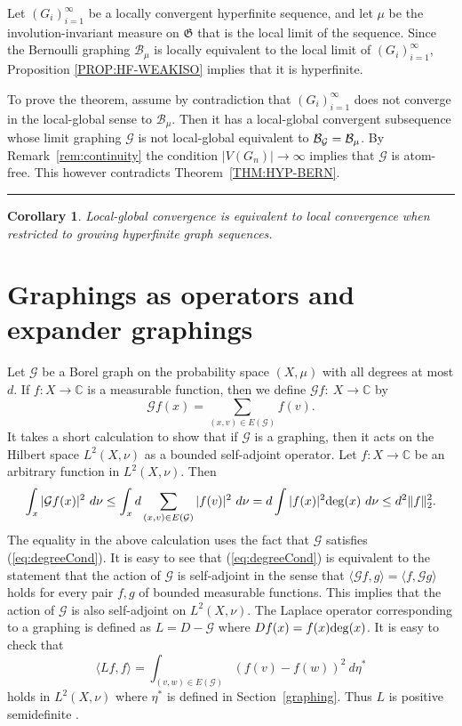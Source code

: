\documentclass{article}
\newtheorem{corollary}[theorem]{Corollary}
\newenvironment{proof}{{\bf Proof.}}{\hfill\rule{2mm}{2mm}\medskip}
\def\GG{\mathcal{G}}\def\HH{\mathcal{H}}\def\II{\mathcal{I}}
\def\Gf{\mathfrak{G}}\def\Hf{\mathfrak{H}}\def\If{\mathfrak{I}}
\begin{document}
\begin{proof}
Let $(G_i)_{i=1}^\infty$ be a locally convergent hyperfinite
sequence, and let $\mu$ be the involution-invariant measure on $\Gf$
that is the local limit of the sequence. Since the Bernoulli graphing
$\mathcal{B}_\mu$ is locally equivalent to the local limit of
$(G_i)_{i=1}^\infty$, Proposition \ref{PROP:HF-WEAKISO} implies that
it is hyperfinite.

To prove the theorem, assume by contradiction that
$(G_i)_{i=1}^\infty$ does not converge in the local-global sense to
$\mathcal{B}_\mu$. Then it has a local-global convergent subsequence
whose limit graphing $\GG$ is not local-global equivalent to
$\BB_\GG=\mathcal{B}_\mu$. By Remark~\ref{rem:continuity} the
condition $|V(G_n)| \to \infty$ implies that $\GG$ is atom-free. This
however contradicts Theorem~\ref{THM:HYP-BERN}.
\end{proof}

\begin{corollary}\label{COR:LOC-LOCGLOB}
Local-global convergence is equivalent to local convergence when
restricted to growing hyperfinite graph sequences.
\end{corollary}

\section{Graphings as operators and expander graphings} \label{sec:expanders}

Let $\GG$ be a Borel graph on the probability space $(X,\mu)$ with
all degrees at most $d$. If $f:X\rightarrow\mathbb{C}$ is a
measurable function, then we define {$\GG f:~X\to \mathbb{C}$} by
$$\GG f(x)=\sum_{(x,v)\in E(\GG)}f(v).$$
It takes a short calculation to show that if $\GG$ is a graphing, then
it acts on the Hilbert space $L^2(X,\nu)$ as a bounded self-adjoint
operator. Let $f:X\rightarrow\mathbb{C}$ be an arbitrary function in
$L^2(X,\nu)$. Then
$$
\int_x |\GG f(x)|^2~d\nu\leq\int_x d\sum_{(x,v)\in
E(\GG)}|f(v)|^2~d\nu=d\int |f(x)|^2{\rm deg}(x)~d\nu\leq
d^2\|f\|_2^2.
$$
The equality in the above calculation uses the fact that $\GG$
satisfies (\ref{eq:degreeCond}). It is easy to see that
(\ref{eq:degreeCond}) is equivalent to the statement that the action
of $\GG$ is self-adjoint in the sense that $\langle \GG f,
g\rangle=\langle f,\GG g \rangle$ holds for every pair $f,g$ of
bounded measurable functions. This implies that the action of $\GG$
is also self-adjoint on $L^2(X,\nu)$. The Laplace operator
corresponding to a graphing is defined as $L=D-\GG$ where
$Df(x)=f(x){\rm deg}(x)$. It is easy to check that
\begin{equation}\label{laplace}
\langle Lf,f\rangle=\int_{(v,w)\in E(\GG)} (f(v)-f(w))^2~d\eta^*
\end{equation}
holds in $L^2(X,\nu)$ where $\eta^*$ is defined in
Section~\ref{graphing}. Thus $L$ is positive semidefinite .
\end{document}
